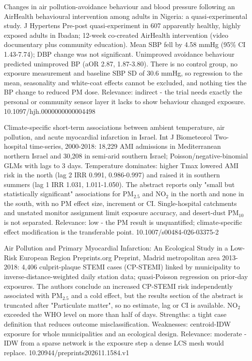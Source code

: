 \documentclass[10pt]{article}
\begin{document}
{Changes in air pollution-avoidance behaviour and blood pressure following an AirHealth behavioural intervention among adults in Nigeria: a quasi-experimental study.}
{J Hypertens}
{Pre-post quasi-experiment in 607 apparently healthy, highly exposed adults in Ibadan; 12-week co-created AirHealth intervention (video documentary plus community education). Mean SBP fell by 4.58 mmHg (95\% CI 1.43-7.74); DBP change was not significant. Unimproved avoidance behaviour predicted unimproved BP (aOR 2.87, 1.87-3.80). There is no control group, no exposure measurement and baseline SBP SD of 30.6 mmHg, so regression to the mean, seasonality and white-coat effects cannot be excluded, and nothing ties the BP change to reduced PM dose. Relevance: indirect - the trial needs exactly the personal or community sensor layer it lacks to show behaviour changed exposure.}
{10.1097/hjh.0000000000004498}

{Climate-specific short-term associations between ambient temperature, air pollution, and acute myocardial infarction in Israel.}
{Int J Biometeorol}
{Two-hospital time-series, 2000-2018: 18,229 AMI admissions in Mediterranean northern Israel and 30,208 in semi-arid southern Israel; Poisson/negative-binomial GLMs with lags to 3 days. Temperature dominates: higher Tmax lowered AMI risk in the north (lag 2 IRR 0.991, 0.986-0.997) and raised it in southern summers (lag 1 IRR 1.031, 1.011-1.050). The abstract reports only "small but statistically significant" associations for PM$_{2.5}$ and NO$_2$ in the north and none in the south, with no PM effect size, increment or CI. Single-hospital catchments and unstated monitor assignment limit exposure accuracy, and desert-dust PM$_{10}$ is not separated. Relevance: low - the PM result is unquantified; climate-specific effect modification is the transferable point.}
{10.1007/s00484-026-03375-2}

{Air Pollution and Primary Myocardial Infarction: An Ecological Study in a Low-Risk European Region}
{Preprints.org}
{Preprint, Madrid metropolitan area 2013-2018: 4,406 culprit-plaque STEMI cases (CP-STEMI) linked by municipality to inverse-distance-weighted daily station data; quasi-Poisson regression on prior-day exposures. The authors conclude an increased CP-STEMI risk independently associated with PM$_{2.5}$ and a cold effect, but the results section of the abstract is truncated after "Particulate matter", so no estimate, lag or CI is available. NO$_2$ exceeded the WHO level on more than half of days. Strengths: a tight case definition that reduces outcome misclassification. Weaknesses: centroid-IDW exposure for whole municipalities and an ecological design. Relevance: moderate - IDW from a sparse network is the exposure step a dense LCS mesh would replace.}
{10.20944/preprints202611.1584.v1}
\end{document}
